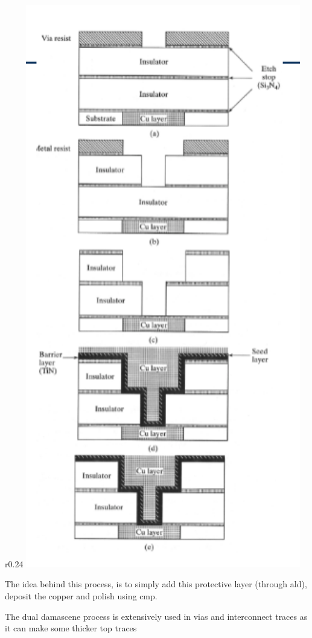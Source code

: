 \documentclass[
]{article}
\begin{document}
r0.24
\includegraphics[width=0.9\textwidth,height=\textheight]{dual_damascene.png}

The idea behind this process, is to simply add this protective layer
(through {ald}), deposit the copper and polish using {cmp}.

The dual damascene process is extensively used in vias and interconnect
traces as it can make some thicker top traces
\end{document}
